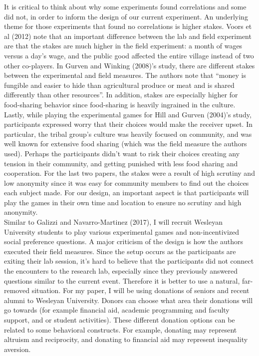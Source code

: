 \documentclass{article}
\begin{document}
It is critical to think about why some experiments found correlations and some did not, in order to inform the design of our current experiment. An underlying theme for those experiments that found no correlations is higher stakes. Voors et al (2012) note that an important difference between the lab and field experiment are that the stakes are much higher in the field experiment: a month of wages versus a day\rq s wage, and the public good affected the entire village instead of two other co-players. In Gurven and Winking (2008)\rq s study, there are different stakes between the experimental and field measures. The authors note that ``money is fungible and easier to hide than agricultural produce or meat and is shared differently than other resources''. In addition, stakes are especially higher for food-sharing behavior since food-sharing is heavily ingrained in the culture. Lastly, while playing the experimental games for Hill and Gurven (2004)\rq s study, participants expressed worry that their choices would make the receiver upset. In particular, the tribal group\rq s culture was heavily focused on community, and was well known for extensive food sharing (which was the field measure the authors used). Perhaps the participants didn\rq t want to risk their choices creating any tension in their community, and getting punished with less food sharing and cooperation. For the last two papers, the stakes were a result of high scrutiny and low anonymity since it was easy for community members to find out the choices each subject made. For our design, an important aspect is that participants will play the games in their own time and location to ensure no scrutiny and high anonymity. \\

Similar to Galizzi and Navarro-Martinez (2017), I will recruit Wesleyan University students to play various experimental games and non-incentivized social preference questions.  A major criticism of the design is how the authors executed their field measures. Since the setup occurs as the participants are exiting their lab session, it\rq s hard to believe that the participants did not connect the encounters to the research lab, especially since they previously answered questions similar to the current event. Therefore it is better to use a natural, far-removed situation. For my paper, I will be using donations of seniors and recent alumni to Wesleyan University. Donors can choose what area their donations will go towards (for example financial aid, academic programming and faculty support, and or student activities). These different donation options can be related to some behavioral constructs. For example, donating may represent altruism and reciprocity, and donating to financial aid may represent inequality aversion. \\
 
\end{document}
